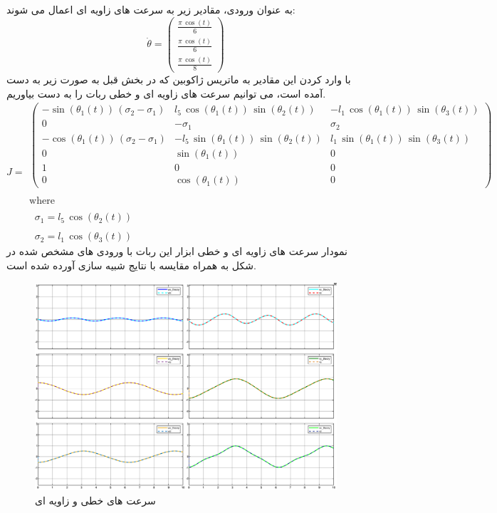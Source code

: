 به عنوان ورودی، مقادیر زیر به سرعت های زاویه ای اعمال می شوند:
\[
\dot{\theta} = 
\begin{pmatrix}
	\frac{\pi \,\cos \left(t\right)}{6} \\
	\frac{\pi \,\cos \left(t\right)}{6} \\
	\frac{\pi \,\cos \left(t\right)}{8}
\end{pmatrix}
\]
با وارد کردن این مقادیر به ماتریس ژاکوبین که در بخش قبل به صورت زیر به دست آمده است، می توانیم سرعت های زاویه ای و خطی ربات را به دست بیاوریم.
\[
J = 
\begin{array}{l}
	\begin{pmatrix}
		-\sin \left(\theta_1 \left(t\right)\right)\,{\left(\sigma_2 -\sigma_1 \right)} & l_5 \,\cos \left(\theta_1 \left(t\right)\right)\,\sin \left(\theta_2 \left(t\right)\right) & -l_1 \,\cos \left(\theta_1 \left(t\right)\right)\,\sin \left(\theta_3 \left(t\right)\right) \\
		0 & -\sigma_1 & \sigma_2 \\
		-\cos \left(\theta_1 \left(t\right)\right)\,{\left(\sigma_2 -\sigma_1 \right)} & -l_5 \,\sin \left(\theta_1 \left(t\right)\right)\,\sin \left(\theta_2 \left(t\right)\right) & l_1 \,\sin \left(\theta_1 \left(t\right)\right)\,\sin \left(\theta_3 \left(t\right)\right) \\
		0 & \sin \left(\theta_1 \left(t\right)\right) & 0 \\
		1 & 0 & 0 \\
		0 & \cos \left(\theta_1 \left(t\right)\right) & 0
	\end{pmatrix} \\
	\\
	\text{where} \\
	\\
	\;\;\sigma_1 = l_5 \,\cos \left(\theta_2 \left(t\right)\right) \\
	\\
	\;\;\sigma_2 = l_1 \,\cos \left(\theta_3 \left(t\right)\right)
\end{array}
\]
نمودار سرعت های زاویه ای و خطی ابزار این ربات با ورودی های مشخص شده در شکل به همراه مقایسه با نتایج شبیه سازی آورده شده است.
\begin{figure}[htbp]
	\centering
	\includegraphics[width=0.7\linewidth]{"../img/compare plot_after_minus"}
	\caption{سرعت های خطی و زاویه ای}
	\label{fig:plotafterminus}
\end{figure}
\FloatBarrier
